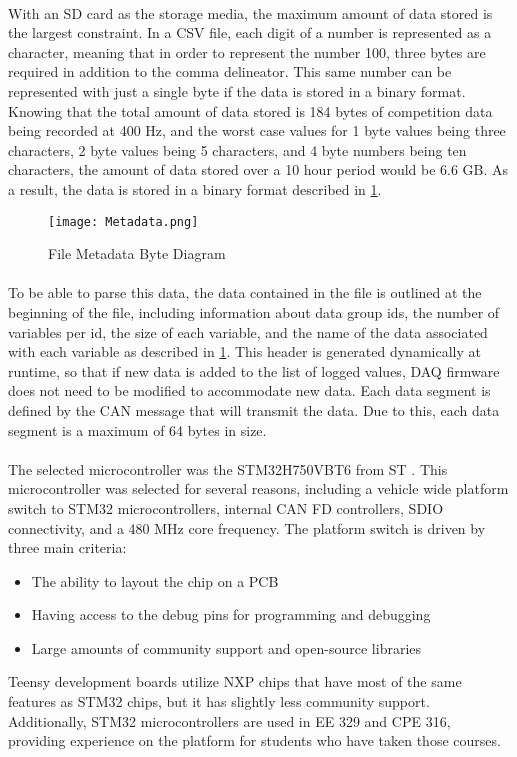 \paragraph{}
With an SD card as the storage media, the maximum amount of data stored is the largest constraint.
In a CSV file, each digit of a number is represented as a character, meaning that in order to represent the number 100, three bytes are required in addition to the comma delineator.
This same number can be represented with just a single byte if the data is stored in a binary format.
Knowing that the total amount of data stored is 184 bytes of competition data being recorded at 400 Hz, and the worst case values for 1 byte values being three characters, 2 byte values being 5 characters, and 4 byte numbers being ten characters, the amount of data stored over a 10 hour period would be 6.6 GB.
As a result, the data is stored in a binary format described in \cref{fig:MetadataDiagram}.

\begin{figure}[H]
	\centering
	\texttt{[image: Metadata.png]}
	\caption{File Metadata Byte Diagram}
	\label{fig:MetadataDiagram}
\end{figure}

\paragraph{}
To be able to parse this data, the data contained in the file is outlined at the beginning of the file, including information about data group ids, the number of variables per id, the size of each variable, and the name of the data associated with each variable as described in \cref{fig:MetadataDiagram}.
This header is generated dynamically at runtime, so that if new data is added to the list of logged values, DAQ firmware does not need to be modified to accommodate new data.
Each data segment is defined by the CAN message that will transmit the data.
Due to this, each data segment is a maximum of 64 bytes in size.

\paragraph{}
The selected microcontroller was the STM32H750VBT6 from ST \cite{STMProductPage}.
This microcontroller was selected for several reasons, including a vehicle wide platform switch to STM32 microcontrollers, internal CAN FD controllers, SDIO connectivity, and a 480 MHz core frequency.
The platform switch is driven by three main criteria:
\begin{itemize}
	\item The ability to layout the chip on a PCB
	\item Having access to the debug pins for programming and debugging
	\item Large amounts of community support and open-source libraries
\end{itemize}
Teensy development boards utilize NXP chips that have most of the same features as STM32 chips, but it has slightly less community support.
Additionally, STM32 microcontrollers are used in EE 329 and CPE 316, providing experience on the platform for students who have taken those courses.

